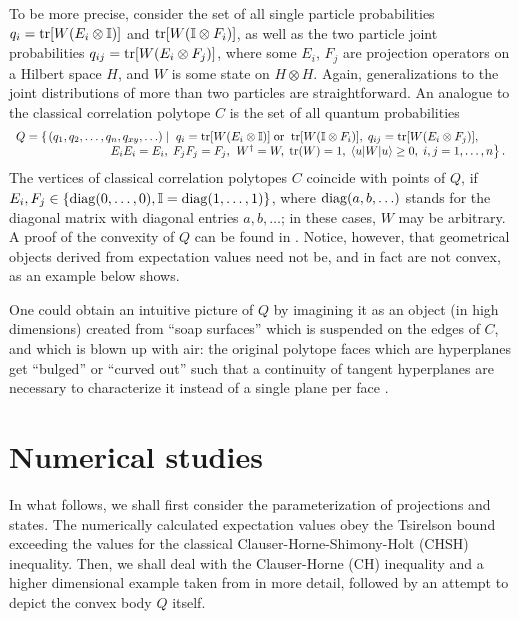 To be more precise,
consider the set of all  single particle
probabilities
$q_{i}={\rm tr}[W(E_{i}\otimes {\Bbb I})]$
and
${\rm tr}[W({\Bbb I}\otimes F_{i})]$,
as well as the two particle joint probabilities
$q_{ij}={\rm tr}[W(E_{i}\otimes F_{j})]$, where some $E_{i}$,
$F_{j}$ are projection operators on a Hilbert space $H$,
and $W$ is some state on $H\otimes H$.
Again, generalizations to the joint distributions of more than two particles are straightforward.
An analogue to the classical correlation polytope  $C$
is the set of all quantum probabilities
\begin{equation}
\label{e-2003-qpoly-Q}
\begin{array}{l}
Q
= \left\{
\left.
\large(q_1, q_2,\ldots , q_n, q_{xy},\ldots \large)
\; \right| \right.\;
q_{i}={\rm tr}[W(E_{i}\otimes {\Bbb I})]\;{\rm or}\;\;{\rm tr}[W({\Bbb I}\otimes F_{i})],\; q_{ij}={\rm tr}[W(E_{i}\otimes F_{j})],\;  \\
\qquad\qquad
\qquad\qquad
E_{i}E_{i}=E_{i},\; F_{j}F_{j}=F_{j},\;
\left.
W^\dagger =W,\; {\rm tr} (W)=1,\;
\langle u | W | u \rangle \ge 0,\;
i,j=1,\ldots ,n
\right\}.
\end{array}\nonumber
\end{equation}
The vertices of classical correlation polytopes $C$
coincide with points of $Q$,
if $E_i,F_j\in \{{\rm diag}(0,\ldots ,0),{\Bbb I}={\rm diag}(1,\ldots ,1)\}$, where
${\rm diag}(a,b,\ldots )$ stands for the diagonal matrix
with diagonal entries $a,b,\ldots $;
in these cases, $W$ may be arbitrary.
A proof of the convexity of $Q$ can be found in  \cite{pit:range-2001}.
Notice, however, that geometrical objects derived from expectation values
need not be, and in fact are not convex, as an example below shows.

One could obtain an intuitive picture of $Q$ by imagining
it as an object (in high dimensions) created from ``soap surfaces''
which is suspended on the edges of
$C$, and which is blown up with air: the original polytope
faces which are hyperplanes get ``bulged''
or ``curved out'' such that a continuity of tangent hyperplanes are
necessary to characterize it instead of a single plane
per face \cite{khalfin-97}.

\section{Numerical studies}

In what follows, we shall first consider
the parameterization of projections and states.
The numerically calculated expectation values obey
the Tsirelson bound exceeding the
values for the classical Clauser-Horne-Shimony-Holt (CHSH) inequality.
Then, we shall deal with the Clauser-Horne (CH) inequality and a higher
dimensional example taken from \cite{2000-poly} in more detail,
followed by an attempt to depict the convex body $Q$ itself.

